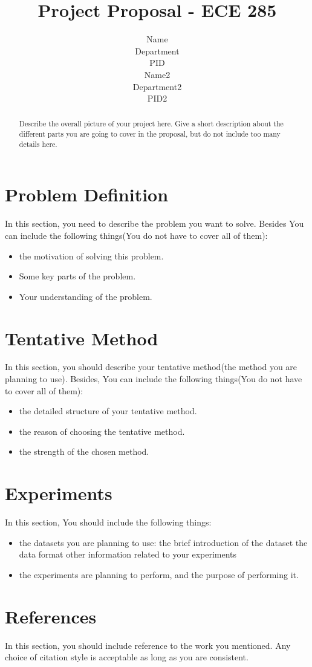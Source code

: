 \documentclass{article}
\title{Project Proposal - ECE 285}
\author{%
  Name \\
  Department\\
  PID\\
  \And
  Name2 \\
  Department2 \\
  PID2 \\
}
\begin{document}
\maketitle

\begin{abstract}
    Describe the overall picture of your project here. Give a short description about the different parts you are going to cover in the proposal, but do not include too many details here.
\end{abstract}

\section{Problem Definition}

In this section, you need to describe the problem you want to solve. Besides You can include the following things(You do not have to cover all of them):
\begin{itemize}
    \item the motivation of solving this problem.
    \item Some key parts of the problem.
    \item Your understanding of the problem.
\end{itemize}

\section{Tentative Method}

In this section, you should describe your tentative method(the method you are planning to use). Besides, You can include the following things(You do not have to cover all of them): 

\begin{itemize}
    \item the detailed structure of your tentative method.
    \item the reason of choosing the tentative method.
    \item the strength of the chosen method.
\end{itemize}

\section{Experiments}

In this section, You should include the following things:

\begin{itemize}
    \item the datasets you are planning to use:
        \subitem the brief introduction of the dataset
        \subitem the data format
        \subitem other information related to your experiments
    \item the experiments are planning to perform, and the purpose of performing it.
\end{itemize}


\section*{References}

In this section, you should include reference to the work you mentioned. Any choice of citation style is acceptable as long as you are consistent.
\end{document}
